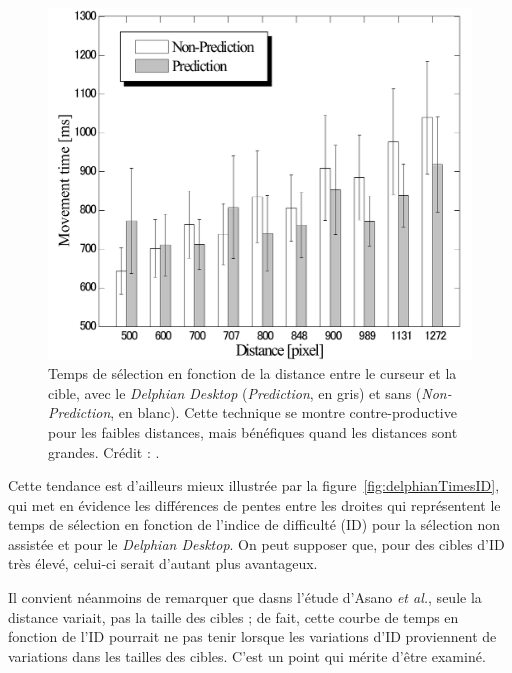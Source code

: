 	\begin{figure}[H]
		\centering
		\includegraphics[width=\textwidth]{figures/ch2/delphianTimes}
		\caption[\emph{Delphian Desktop} -- temps de sélection]{Temps de sélection en fonction de la distance entre le curseur et la cible, avec le \emph{Delphian Desktop} (\emph{Prediction}, en gris) et sans (\emph{Non-Prediction}, en blanc). Cette technique se montre contre-productive pour les faibles distances, mais bénéfiques quand les distances sont grandes. Crédit : \cite{asano2005predictive}.}
		\label{fig:delphianTimes}
	\end{figure}

	Cette tendance est d'ailleurs mieux illustrée par la figure~\ref{fig:delphianTimesID}, qui met en évidence les différences de pentes entre les droites qui représentent le temps de sélection en fonction de l'indice de difficulté (ID) pour la sélection non assistée et pour le \emph{Delphian Desktop}. On peut supposer que, pour des cibles d'ID très élevé, celui-ci serait d'autant plus avantageux.
	
	Il convient néanmoins de remarquer que dasns l'étude d'Asano \emph{et al.}, seule la distance variait, pas la taille des cibles ; de fait, cette courbe de temps en fonction de l'ID pourrait ne pas tenir lorsque les variations d'ID proviennent de variations dans les tailles des cibles. C'est un point qui mérite d'être examiné.

